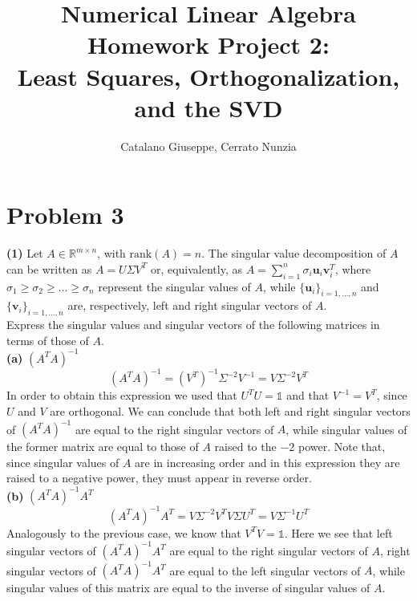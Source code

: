 \documentclass[a4paper,11pt]{article}
\newcommand{\R}{\mathbb{R}}
\begin{document}
	\author{Catalano Giuseppe, Cerrato Nunzia}
	\title{Numerical Linear Algebra Homework Project 2:\\Least Squares, Orthogonalization, and the SVD}
	\date{}
	\maketitle
	
\section*{Problem 3}	
\noindent \textbf{(1)} Let $A \in \R^{m\times n}$, with $\text{rank}(A) = n$. The singular value decomposition of $A$ can be written as $A = U \Sigma V^T$ or, equivalently, as $A = \sum_{i=1}^n \sigma_i \textbf{u}_i \textbf{v}_i^T$, where $\sigma_1 \ge \sigma_2 \ge \dots \ge \sigma_n$ represent the singular values of $A$, while $\{\textbf{u}_{i}\}_{i=1,\dots,n}$ and $\{\textbf{v}_{i}\}_{i=1,\dots,n}$ are, respectively, left and right singular vectors of $A$.\\

\noindent Express the singular values and singular vectors of the following matrices in terms of those of $A$.\\

\noindent \textbf{(a)} {$(A^{T}A)^{-1}$}
\[(A^{T}A)^{-1} = (V^{T})^{-1}\Sigma^{-2}V^{-1}=V\Sigma^{-2}V^{T}\]
In order to obtain this expression we used that $U^{T}U=\mathbb{1}$ and that $V^{-1}=V^{T}$, since $U$ and $V$ are orthogonal. We can conclude that both left and right singular vectors of $(A^{T}A)^{-1}$ are equal to the right singular vectors of $A$, while singular values of the former matrix are equal to those of $A$ raised to the $-2$ power. Note that, since singular values of $A$ are in increasing order and in this expression they are raised to a negative power, they must appear in reverse order.\\


\noindent \textbf{(b)} $(A^{T}A)^{-1}A^{T}$
\[(A^{T}A)^{-1}A^{T} = V\Sigma^{-2}V^{T}V\Sigma U^{T}=V\Sigma^{-1}U^{T}\]
Analogously to the previous case, we know that $V^{T}V=\mathbb{1}$. Here we see that left singular vectors of $(A^{T}A)^{-1}A^{T}$ are equal to the right singular vectors of $A$, right singular vectors of $(A^{T}A)^{-1}A^{T}$ are equal to the left singular vectors of $A$, while singular values of this matrix are equal to the inverse of singular values of $A$.\\
\end{document}

